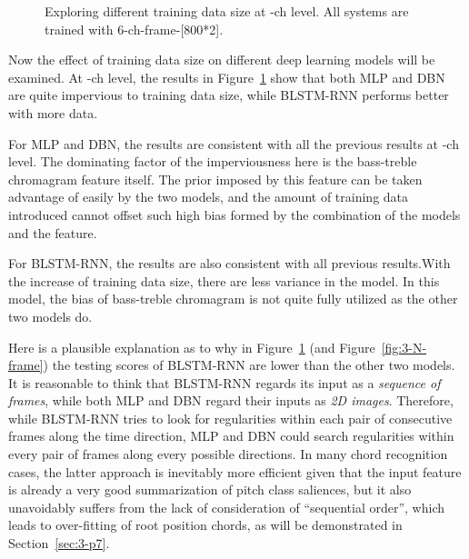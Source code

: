\begin{figure}[htb]
{
	}
	\caption{Exploring different training data size at -ch level. All systems are trained with 6-ch-frame-[800*2].}
	\label{fig:3-ch-data}
\end{figure}

Now the effect of training data size on different deep learning models will be examined. At -ch level, the results in Figure~\ref{fig:3-ch-data} show that both MLP and DBN are quite impervious to training data size, while BLSTM-RNN performs better with more data. 

For MLP and DBN, the results are consistent with all the previous results at -ch level. The dominating factor of the imperviousness here is the bass-treble chromagram feature itself. The prior imposed by this feature can be taken advantage of easily by the two models, and the amount of training data introduced cannot offset such high bias formed by the combination of the models and the feature.

For BLSTM-RNN, the results are also consistent with all previous results.With the increase of training data size, there are less variance in the model. In this model, the bias of bass-treble chromagram is not quite fully utilized as the other two models do.

Here is a plausible explanation as to why in Figure~\ref{fig:3-ch-data} (and Figure~\ref{fig:3-N-frame}) the testing scores of BLSTM-RNN are lower than the other two models. It is reasonable to think that BLSTM-RNN regards its input as a {\it sequence of frames}, while both MLP and DBN regard their inputs as \textit{2D images}. Therefore, while BLSTM-RNN tries to look for regularities within each pair of consecutive frames along the time direction, MLP and DBN could search regularities within every pair of frames along every possible directions. In many chord recognition cases, the latter approach is inevitably more efficient given that the input feature is already a very good summarization of pitch class saliences, but it also unavoidably suffers from the lack of consideration of ``sequential order'', which leads to over-fitting of root position chords, as will be demonstrated in Section~\ref{sec:3-p7}.



